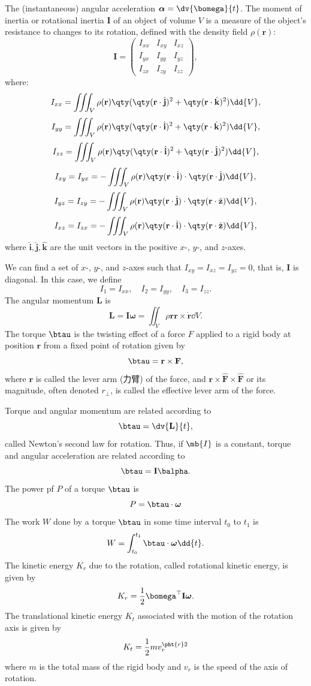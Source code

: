 \documentclass[a4paper,12pt]{article}
\begin{document}
The (instantaneous) angular acceleration $\boldsymbol{\alpha}=\dv{\bomega}{t}$.
The moment of inertia or rotational inertia $\mathbf{I}$ of an object of volume $V$ is a measure of the object's resistance to changes to its rotation, defined with the density field $\rho(\mathbf{r})$:
\[\mathbf{I}=\begin{pmatrix}
    I_{xx} & I_{xy} & I_{xz}\\
    I_{yx} & I_{yy} & I_{yz}\\
    I_{zx} & I_{zy} & I_{zz}
\end{pmatrix},\]
where:
\[I_{xx}=\iiint_V\rho(\mathbf{r})\qty(\qty(\mathbf{r}\cdot\hat{\mathbf{j}})^2+\qty(\mathbf{r}\cdot\hat{\mathbf{k}})^2)\dd{V},\]
\[I_{yy}=\iiint_V\rho(\mathbf{r})\qty(\qty(\mathbf{r}\cdot\hat{\mathbf{i}})^2+\qty(\mathbf{r}\cdot\hat{\mathbf{k}})^2)\dd{V},\]
\[I_{zz}=\iiint_V\rho(\mathbf{r})\qty(\qty(\mathbf{r}\cdot\hat{\mathbf{i}})^2+\qty(\mathbf{r}\cdot\hat{\mathbf{j}})^2)\dd{V},\]
\[I_{xy}=I_{yx}=-\iiint_V\rho(\mathbf{r})\qty(\mathbf{r}\cdot\hat{\mathbf{i}})\cdot\qty(\mathbf{r}\cdot\hat{\mathbf{j}})\dd{V},\]
\[I_{yz}=I_{zy}=-\iiint_V\rho(\mathbf{r})\qty(\mathbf{r}\cdot\hat{\mathbf{j}})\cdot\qty(\mathbf{r}\cdot\hat{\mathbf{z}})\dd{V},\]
\[I_{xz}=I_{zx}=-\iiint_V\rho(\mathbf{r})\qty(\mathbf{r}\cdot\hat{\mathbf{i}})\cdot\qty(\mathbf{r}\cdot\hat{\mathbf{z}})\dd{V},\]
where $\hat{\mathbf{i}},\hat{\mathbf{j}},\hat{\mathbf{k}}$ are the unit vectors in the positive $x$-, $y$-, and $z$-axes.

We can find a set of $x$-, $y$-, and $z$-axes such that $I_{xy}=I_{xz}=I_{yz}=0$, that is, $\mathbf{I}$ is diagonal. In this case, we define
\[I_1=I_{xx},\quad I_2=I_{yy}, \quad I_3=I_{zz}.\]
The angular momentum $\mathbf{L}$ is
\[\mathbf{L}=\mathbf{I}\boldsymbol{\omega}=\iint_V\rho{\mathbf{r}}\mathbf{r}\times\dot{\mathbf{r}}\dd{V}.\]
The torque $\btau$ is the twisting effect of a force $F$ applied to a rigid body at position $\mathbf{r}$ from a fixed point of rotation given by
\[\btau=\mathbf{r}\times\mathbf{F},\]
where $\mathbf{r}$ is called the lever arm (力臂) of the force, and $\mathbf{r}\times\hat{\mathbf{F}}\times\hat{\mathbf{F}}$ or its magnitude, often denoted $r_\perp$, is called the effective lever arm of the force.

Torque and angular momentum are related according to
\[\btau=\dv{\mathbf{L}}{t},\]
called Newton's second law for rotation. Thus, if $\mb{I}$ is a constant, torque and angular acceleration are related according to
\[\btau=\mathbf{I}\balpha.\]
The power pf $P$ of a torque $\btau$ is
\[P=\btau\cdot\boldsymbol{\omega}\]
The work $W$ done by a torque $\btau$ in some time interval $t_0$ to $t_1$ is
\[W=\int_{t_0}^{t_1}\btau\cdot\boldsymbol{\omega}\dd{t}.\]
The kinetic energy $K_r$ due to the rotation, called rotational kinetic energy, is given by
\[K_r=\frac{1}{2}\bomega^\top\mathbf{I}\boldsymbol{\omega}.\]
The translational kinetic energy $K_t$ associated with the motion of the rotation axis is given by
\[K_t=\frac{1}{2}mv_r^{\pht{r}2}\]
where $m$ is the total mass of the rigid body and $v_r$ is the speed of the axis of rotation.
\end{document}
